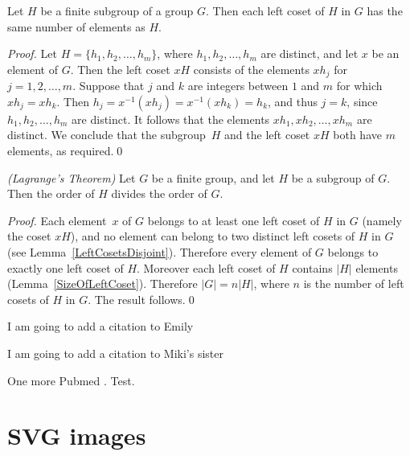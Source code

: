 \begin{lemma}
\label{SizeOfLeftCoset}
Let $H$ be a finite subgroup of a group $G$.  Then each left
coset of $H$ in $G$ has the same number of elements as $H$.
\end{lemma}

\begin{proof}
Let $H = \{ h_1, h_2,\ldots, h_m\}$, where
$h_1, h_2,\ldots, h_m$ are distinct, and let $x$ be an
element of $G$.  Then the left coset $xH$ consists of
the elements $x h_j$ for $j = 1,2,\ldots,m$.
Suppose that $j$ and $k$ are integers between
$1$ and $m$ for which $x h_j = x h_k$.  Then
$h_j = x^{-1} (x h_j) = x^{-1} (x h_k) = h_k$,
and thus $j = k$, since $h_1, h_2,\ldots, h_m$
are distinct.  It follows that the elements
$x h_1, x h_2,\ldots, x h_m$ are distinct.
We conclude that the subgroup~$H$ and the left
coset $xH$ both have $m$ elements,
as required.\qed
\end{proof}

\begin{theorem}
\emph{(Lagrange's Theorem)}
\label{Lagrange}
Let $G$ be a finite group, and let $H$ be a subgroup
of $G$.  Then the order of $H$ divides the order of $G$.
\end{theorem}

\begin{proof}
Each element~$x$ of $G$ belongs to at least one left coset
of $H$ in $G$ (namely the coset $xH$), and no element
can belong to two distinct left cosets of $H$ in $G$
(see Lemma~\ref{LeftCosetsDisjoint}).  Therefore every
element of $G$ belongs to exactly one left coset of $H$.
Moreover each left coset of $H$ contains $|H|$ elements
(Lemma~\ref{SizeOfLeftCoset}).  Therefore $|G| = n |H|$,
where $n$ is the number of left cosets of $H$ in $G$.
The result follows.\qed
\end{proof}

I am going to add a citation to Emily \cite{20518713} \cite{20407604} 

I am going to add a citation to Miki's sister \cite{Agrawal_2004}

One more Pubmed \cite{25974270}. Test.


\section{SVG images}

